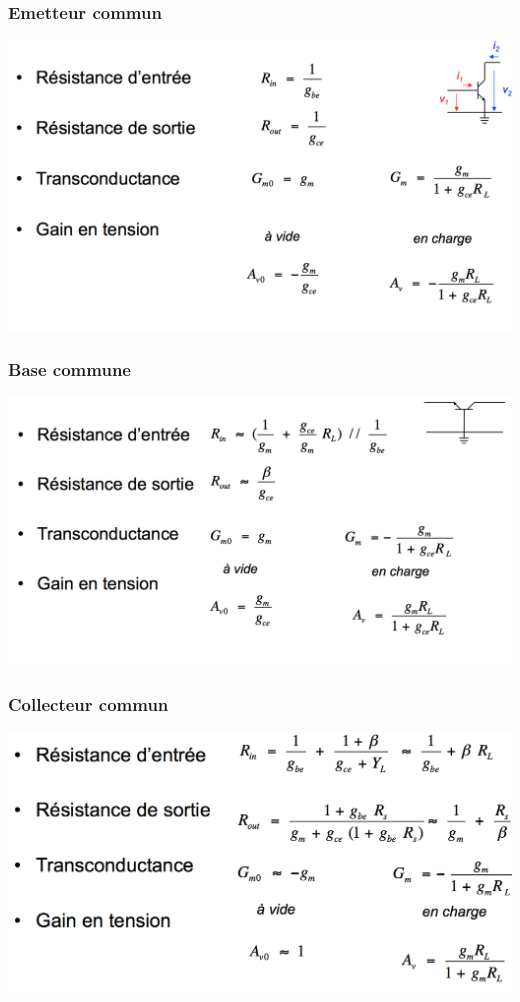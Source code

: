 \documentclass[]{article}
\begin{document}
\subsubsection{Emetteur commun}
\includegraphics[scale=0.5]{emetteur}
\subsubsection{Base commune}
\includegraphics[scale=0.5]{base}
\subsubsection{Collecteur commun}
\includegraphics[scale=0.5]{coll}
\end{document}
